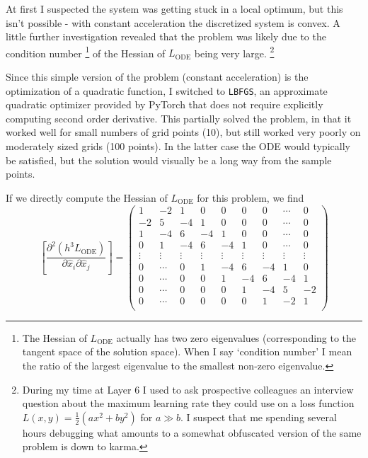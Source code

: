 \documentclass{article}
\begin{document}
At first I suspected the system was getting stuck in a local optimum, but this isn't possible - with constant acceleration the discretized system is convex.
A little further investigation revealed that the problem was likely due to the condition number%
\footnote{
The Hessian of $L_{\mathrm{ODE}}$ actually has two zero eigenvalues (corresponding to the tangent space of the solution space). When I say `condition number' I mean the ratio of the largest eigenvalue to the smallest non-zero eigenvalue.
}
 of the Hessian of $L_{\mathrm{ODE}}$ being very large.%
\footnote{
During my time at Layer 6 I used to ask prospective colleagues an interview question about the maximum learning rate they could use on a loss function $L(x, y) = \frac{1}{2} \left( a x^2 + b y^2 \right)$ for $ a \gg b$.
I suspect that me spending several hours debugging what amounts to a somewhat obfuscated version of the same problem is down to karma.
}

Since this simple version of the problem (constant acceleration) is the optimization of a quadratic function, I switched to \texttt{LBFGS}, an approximate quadratic optimizer provided by PyTorch that does not require explicitly computing second order derivative.
This partially solved the problem, in that it worked well for small numbers of grid points (10), but still worked very poorly on moderately sized grids (100 points).
In the latter case the ODE would typically be satisfied, but the solution would visually be a long way from the sample points.

If we directly compute the Hessian of $L_{\mathrm{ODE}}$ for this problem, we find
$$
\left[\frac{\partial^2 (h^3 L_{\mathrm{ODE}})}{\partial \hat{x}_i \partial \hat{x}_j} \right] = \begin{pmatrix}
1 & -2 & 1 & 0 & 0 & 0 & 0 & \cdots & 0 \\
-2 & 5 & -4 & 1 & 0 & 0 & 0 & \cdots & 0 \\
1 & -4 & 6 & -4 & 1 & 0 & 0 & \cdots & 0 \\
0 & 1 & -4 & 6 & -4 & 1 & 0 & \cdots & 0 \\
\vdots & \vdots & \vdots & \vdots & \vdots & \vdots & \vdots & \vdots & \vdots \\
0 & \cdots & 0 & 1 & -4 & 6 & -4 & 1 & 0 \\
0 & \cdots & 0 & 0 & 1 & -4 & 6 & -4 & 1 \\
0 & \cdots & 0 & 0 & 0 & 1 & -4 & 5 & -2 \\
0 & \cdots & 0 & 0 & 0 & 0 & 1 & -2 & 1 \\
\end{pmatrix}
$$
\end{document}
